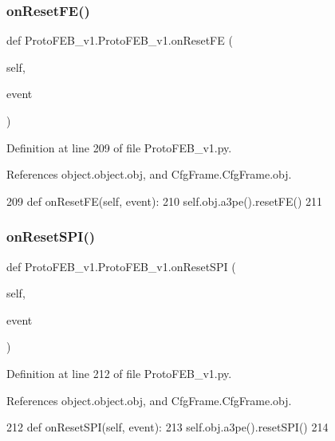 \subsubsection{\texorpdfstring{on\+Reset\+F\+E()}{onResetFE()}}
{\footnotesize\ttfamily def Proto\+F\+E\+B\+\_\+v1.\+Proto\+F\+E\+B\+\_\+v1.\+on\+Reset\+FE (\begin{DoxyParamCaption}\item[{}]{self,  }\item[{}]{event }\end{DoxyParamCaption})}



Definition at line 209 of file Proto\+F\+E\+B\+\_\+v1.\+py.



References object.\+object.\+obj, and Cfg\+Frame.\+Cfg\+Frame.\+obj.


\begin{DoxyCode}
209     \textcolor{keyword}{def }onResetFE(self, event):
210         self.obj.a3pe().resetFE()
211 
\end{DoxyCode}
\mbox{\label{classProtoFEB__v1_1_1ProtoFEB__v1_a4ac4ca3d899a986193fe0c25b4c5d72f}} 
\subsubsection{\texorpdfstring{on\+Reset\+S\+P\+I()}{onResetSPI()}}
{\footnotesize\ttfamily def Proto\+F\+E\+B\+\_\+v1.\+Proto\+F\+E\+B\+\_\+v1.\+on\+Reset\+S\+PI (\begin{DoxyParamCaption}\item[{}]{self,  }\item[{}]{event }\end{DoxyParamCaption})}



Definition at line 212 of file Proto\+F\+E\+B\+\_\+v1.\+py.



References object.\+object.\+obj, and Cfg\+Frame.\+Cfg\+Frame.\+obj.


\begin{DoxyCode}
212     \textcolor{keyword}{def }onResetSPI(self, event):
213         self.obj.a3pe().resetSPI()
214 
\end{DoxyCode}
\mbox{\label{classProtoFEB__v1_1_1ProtoFEB__v1_a69c60670b21c01003a31f0407a5b5b4a}} 
